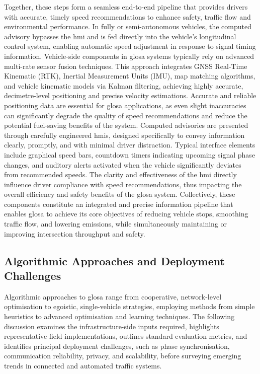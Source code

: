 Together, these steps form a seamless end-to-end pipeline that provides drivers with accurate, timely speed recommendations to enhance safety, traffic flow and environmental performance. In fully or semi-autonomous vehicles, the computed advisory bypasses the \ac{hmi} and is fed directly into the vehicle’s longitudinal control system, enabling automatic speed adjustment in response to signal timing information.
\mynewline
Vehicle-side components in \ac{glosa} systems typically rely on advanced multi-rate sensor fusion techniques. This approach integrates GNSS Real-Time Kinematic (RTK), Inertial Measurement Units (IMU), \ac{map} matching algorithms, and vehicle kinematic models via Kalman filtering, achieving highly accurate, decimetre-level positioning and precise velocity estimations. Accurate and reliable positioning data are essential for \ac{glosa} applications, as even slight inaccuracies can significantly degrade the quality of speed recommendations and reduce the potential fuel-saving benefits of the system. \cite{Vignarca2023} Computed advisories are presented through carefully engineered \acp{hmi}, designed specifically to convey information clearly, promptly, and with minimal driver distraction. Typical interface elements include graphical speed bars, countdown timers indicating upcoming signal phase changes, and auditory alerts activated when the vehicle significantly deviates from recommended speeds. The clarity and effectiveness of the \ac{hmi} directly influence driver compliance with speed recommendations, thus impacting the overall efficiency and safety benefits of the \ac{glosa} system.
\mynewline
Collectively, these components constitute an integrated and precise information pipeline that enables \ac{glosa} to achieve its core objectives of reducing vehicle stops, smoothing traffic flow, and lowering emissions, while simultaneously maintaining or improving intersection throughput and safety.


\subsection{Algorithmic Approaches and Deployment Challenges}
\label{subsec:glosa_algorithms_challenges}

Algorithmic approaches to \ac{glosa} range from cooperative, network-level optimisation to egoistic, single-vehicle strategies, employing methods from simple heuristics to advanced optimisation and learning techniques. The following discussion examines the infrastructure-side inputs required, highlights representative field implementations, outlines standard evaluation metrics, and identifies principal deployment challenges, such as phase synchronisation, communication reliability, privacy, and scalability, before surveying emerging trends in connected and automated traffic systems.


